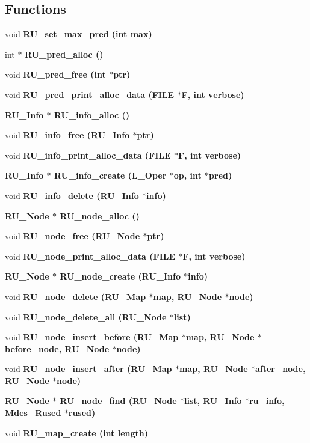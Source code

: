 \subsection*{Functions}
\begin{CompactItemize}
\item 
void \bf{RU\_\-set\_\-max\_\-pred} (int max)
\item 
int $\ast$ \bf{RU\_\-pred\_\-alloc} ()
\item 
void \bf{RU\_\-pred\_\-free} (int $\ast$ptr)
\item 
void \bf{RU\_\-pred\_\-print\_\-alloc\_\-data} (FILE $\ast$\bf{F}, int \bf{verbose})
\item 
\bf{RU\_\-Info} $\ast$ \bf{RU\_\-info\_\-alloc} ()
\item 
void \bf{RU\_\-info\_\-free} (\bf{RU\_\-Info} $\ast$ptr)
\item 
void \bf{RU\_\-info\_\-print\_\-alloc\_\-data} (FILE $\ast$\bf{F}, int \bf{verbose})
\item 
\bf{RU\_\-Info} $\ast$ \bf{RU\_\-info\_\-create} (L\_\-Oper $\ast$op, int $\ast$pred)
\item 
void \bf{RU\_\-info\_\-delete} (\bf{RU\_\-Info} $\ast$info)
\item 
\bf{RU\_\-Node} $\ast$ \bf{RU\_\-node\_\-alloc} ()
\item 
void \bf{RU\_\-node\_\-free} (\bf{RU\_\-Node} $\ast$ptr)
\item 
void \bf{RU\_\-node\_\-print\_\-alloc\_\-data} (FILE $\ast$\bf{F}, int \bf{verbose})
\item 
\bf{RU\_\-Node} $\ast$ \bf{RU\_\-node\_\-create} (\bf{RU\_\-Info} $\ast$info)
\item 
void \bf{RU\_\-node\_\-delete} (\bf{RU\_\-Map} $\ast$map, \bf{RU\_\-Node} $\ast$\bf{node})
\item 
void \bf{RU\_\-node\_\-delete\_\-all} (\bf{RU\_\-Node} $\ast$\bf{list})
\item 
void \bf{RU\_\-node\_\-insert\_\-before} (\bf{RU\_\-Map} $\ast$map, \bf{RU\_\-Node} $\ast$before\_\-node, \bf{RU\_\-Node} $\ast$\bf{node})
\item 
void \bf{RU\_\-node\_\-insert\_\-after} (\bf{RU\_\-Map} $\ast$map, \bf{RU\_\-Node} $\ast$after\_\-node, \bf{RU\_\-Node} $\ast$\bf{node})
\item 
\bf{RU\_\-Node} $\ast$ \bf{RU\_\-node\_\-find} (\bf{RU\_\-Node} $\ast$\bf{list}, \bf{RU\_\-Info} $\ast$ru\_\-info, Mdes\_\-Rused $\ast$rused)
\item 
void \bf{RU\_\-map\_\-create} (int length)
\item 

\end{CompactItemize}
